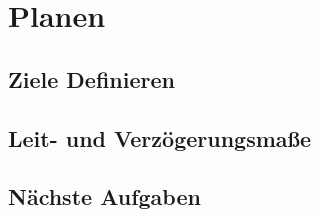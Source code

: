 \section{Planen}

\subsection{Ziele Definieren}

\subsection{Leit- und Verzögerungsmaße}

\subsection{Nächste Aufgaben}

